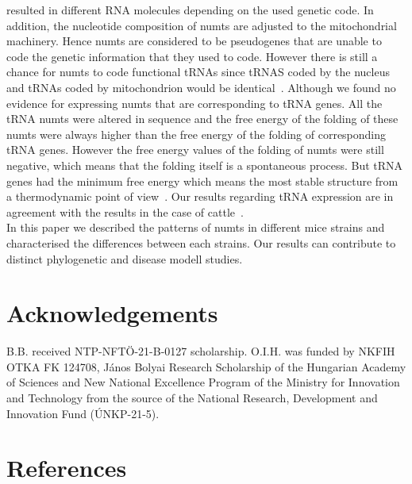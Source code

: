\documentclass[a4paper,12pt]{article}
\numberwithin{equation}{section} %
\begin{document}
resulted in different RNA molecules depending on the used genetic code. In addition, the nucleotide composition of numts are adjusted to the mitochondrial machinery. Hence numts are considered to be pseudogenes that are unable to code the genetic information that they used to code. However there is still a chance for numts to code functional tRNAs since tRNAS coded by the nucleus and tRNAs coded by mitochondrion would be identical~. Although we found no evidence for expressing numts that are corresponding to tRNA genes. All the tRNA numts were altered in sequence and the free energy of the folding of these numts were always higher than the free energy of the folding of corresponding tRNA genes. However the free energy values of the folding of numts were still negative, which means that the folding itself is a spontaneous process. But tRNA genes had the minimum free energy which means the most stable structure from a thermodynamic point of view~. Our results regarding tRNA expression are in agreement with the results in the case of cattle~.\\ \indent In this paper we described the patterns of numts in different mice strains and characterised the differences between each strains. Our results can contribute to distinct phylogenetic and disease modell studies.

\section{Acknowledgements}
\indent B.B. received NTP-NFTÖ-21-B-0127 scholarship. O.I.H. was funded by NKFIH OTKA FK 124708, János Bolyai Research Scholarship of the Hungarian Academy of Sciences and New National Excellence Program of the Ministry for Innovation and Technology from the source of the National Research, Development and Innovation Fund (ÚNKP-21-5).
\section{References}
\renewcommand{\refname}{}


\end{document}
